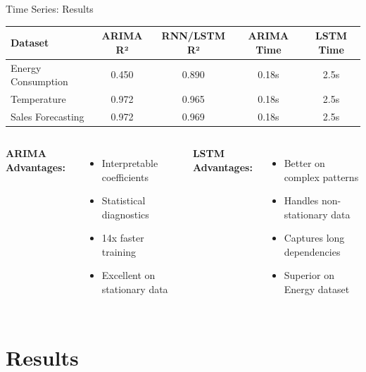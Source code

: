 \documentclass[aspectratio=169,10pt]{beamer}
\begin{document}
\begin{frame}{Time Series: Results}
\begin{center}
\begin{tabular}{lcccc}
\toprule
\textbf{Dataset} & \textbf{ARIMA R²} & \textbf{RNN/LSTM R²} & \textbf{ARIMA Time} & \textbf{LSTM Time} \\
\midrule
Energy Consumption & 0.450 & \textcolor{dlcolor}{0.890} & 0.18s & 2.5s \\
Temperature & \textcolor{statcolor}{0.972} & 0.965 & 0.18s & 2.5s \\
Sales Forecasting & \textcolor{statcolor}{0.972} & 0.969 & 0.18s & 2.5s \\
\bottomrule
\end{tabular}
\end{center}

\vspace{0.5cm}

\begin{columns}
\textcolor{statcolor}{\textbf{ARIMA Advantages:}}
\begin{itemize}
    \item Interpretable coefficients
    \item Statistical diagnostics
    \item 14x faster training
    \item Excellent on stationary data
\end{itemize}

\textcolor{dlcolor}{\textbf{LSTM Advantages:}}
\begin{itemize}
    \item Better on complex patterns
    \item Handles non-stationary data
    \item Captures long dependencies
    \item Superior on Energy dataset
\end{itemize}
\end{columns}
\end{frame}

\section{Results}
\end{document}
